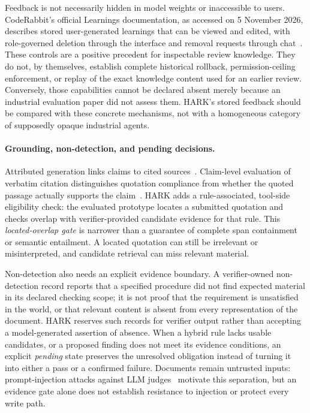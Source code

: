 Feedback is not necessarily hidden in model weights or inaccessible to users. CodeRabbit's official Learnings documentation, as accessed on 5 November 2026, describes stored user-generated learnings that can be viewed and edited, with role-governed deletion through the interface and removal requests through chat~\cite{coderabbitLearnings}. These controls are a positive precedent for inspectable review knowledge. They do not, by themselves, establish complete historical rollback, permission-ceiling enforcement, or replay of the exact knowledge content used for an earlier review. Conversely, those capabilities cannot be declared absent merely because an industrial evaluation paper did not assess them. HARK's stored feedback should be compared with these concrete mechanisms, not with a homogeneous category of supposedly opaque industrial agents.

\paragraph{Grounding, non-detection, and pending decisions.}
Attributed generation links claims to cited sources~\cite{gao2023}. Claim-level evaluation of verbatim citation distinguishes quotation compliance from whether the quoted passage actually supports the claim~\cite{zhang2026cite}. HARK adds a rule-associated, tool-side eligibility check: the evaluated prototype locates a submitted quotation and checks overlap with verifier-provided candidate evidence for that rule. This \emph{located-overlap gate} is narrower than a guarantee of complete span containment or semantic entailment. A located quotation can still be irrelevant or misinterpreted, and candidate retrieval can miss relevant material.

Non-detection also needs an explicit evidence boundary. A verifier-owned non-detection record reports that a specified procedure did not find expected material in its declared checking scope; it is not proof that the requirement is unsatisfied in the world, or that relevant content is absent from every representation of the document. HARK reserves such records for verifier output rather than accepting a model-generated assertion of absence. When a hybrid rule lacks usable candidates, or a proposed finding does not meet its evidence conditions, an explicit \emph{pending} state preserves the unresolved obligation instead of turning it into either a pass or a confirmed failure. Documents remain untrusted inputs: prompt-injection attacks against LLM judges~\cite{shi2024inject} motivate this separation, but an evidence gate alone does not establish resistance to injection or protect every write path.

